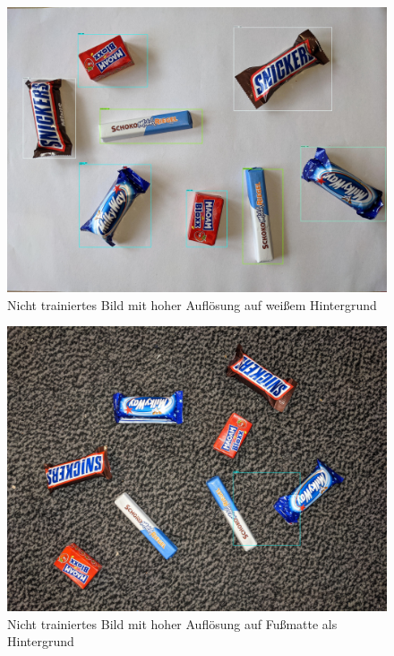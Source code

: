     \begin{figure}[H]
        \centering
        \includegraphics[angle = 90, width = \textwidth]{Bilder/models/model_comparison/ssd_mobilenet_v2_fpnlite_640x640_coco17_tpu-8/HD_on_white.jpg}
        \caption{Nicht trainiertes Bild mit hoher Auflösung auf weißem Hintergrund}
    \end{figure}
    
    \begin{figure}[H]
        \centering
        \includegraphics[angle = 90, width = \textwidth]{Bilder/models/model_comparison/ssd_mobilenet_v2_fpnlite_640x640_coco17_tpu-8/HD_on_doormat.jpg}
        \caption{Nicht trainiertes Bild mit hoher Auflösung auf Fußmatte als Hintergrund}
    \end{figure}
    
